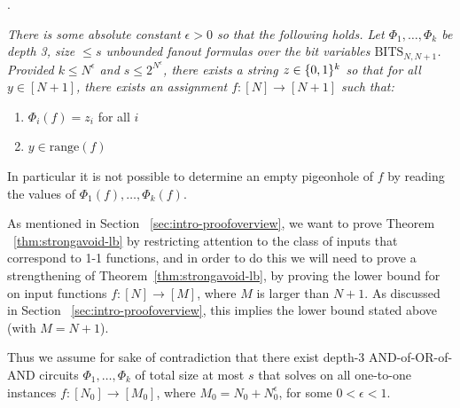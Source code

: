 \medskip

. {\it There is some absolute constant $\epsilon> 0$ so that the following holds. Let $\Phi_1,\ldots,\Phi_k$ be depth 3, size $\leq s$ unbounded fanout formulas over the bit variables $\mathrm{BITS}_{N,N+1}$. Provided $k \leq N^{\epsilon}$ and $s \leq 2^{N^{\epsilon}}$, there exists a string $z \in \{0,1\}^k$ so that for all $y \in [N+1]$, there exists an assignment $f: [N] \rightarrow [N+1]$ such that:
\begin{enumerate}
    \item $\Phi_i(f) = z_i$ for all $i$
    \item $y \in \mathrm{range}(f)$
\end{enumerate}
In particular it is not possible to determine an empty pigeonhole of $f$ by reading the values of $\Phi_1(f),\ldots,\Phi_k(f)$.}

\medskip

As mentioned in Section ~\ref{sec:intro-proofoverview}, we want to prove Theorem ~\ref{thm:strongavoid-lb} by restricting attention to the class of inputs that correspond to 1-1 functions, and in order to do this we will need to prove a strengthening of 
Theorem~\ref{thm:strongavoid-lb}, by proving the lower bound for \avoid on input functions $f: [N] \rightarrow [M]$, where $M$ is larger than $N+1$. 
As discussed in Section ~\ref{sec:intro-proofoverview}, this implies the lower bound stated above (with $M=N+1$).
 
Thus we assume for sake of contradiction that there exist depth-3 AND-of-OR-of-AND circuits $\Phi_1, \ldots,\Phi_k$ of total size at most $s$ that solves \avoid on all one-to-one instances $f: [N_0] \rightarrow [M_0]$, where $M_0 = N_0 + N_0^{\epsilon}$, for some $0<\epsilon<1$.

